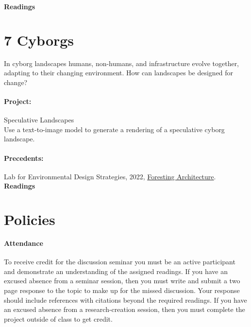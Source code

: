\documentclass[11pt,article,oneside]{memoir}
\begin{document}
\noindent
\textbf{Readings}
\nocite{*}
\setlength{}
\printbibliography[keyword=more-than-human, heading=none]

\clearpage

\section{7 Cyborgs}

In cyborg landscapes 
humans, non-humans, and infrastructure evolve together, 
adapting to their changing environment. 
How can landscapes be designed for change?

\paragraph{Project:} Speculative Landscapes \\

\noindent
Use a text-to-image model to generate a rendering of a speculative cyborg landscape.

\paragraph{Precedents:} 
Lab for Environmental Design Strategies, 2022, \href{https://lab-eds.org}{Foresting Architecture}.
\\

\noindent
\textbf{Readings}
\nocite{*}
\setlength{}
\printbibliography[keyword=cyborgs, heading=none]



\section{Policies}

\paragraph{Attendance}

To receive credit for the discussion seminar 
you must be an active participant 
and demonstrate an understanding of the assigned readings.
If you have an excused absence from a seminar session,
then you must write and submit a two page response to the topic
to make up for the missed discussion.
Your response should include references with citations
beyond the required readings. 
If you have an excused absence from a research-creation session,
then you must complete the project outside of class to get credit. 
\end{document}

